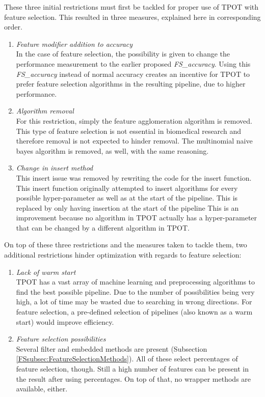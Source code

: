 \documentclass[10pt,a4paper]{report}
\begin{document}
	These three initial restrictions must first be tackled for proper use of TPOT with feature selection. This resulted in three measures, explained here in corresponding order.
	
	\begin{enumerate}
		\item \textit{Feature modifier addition to accuracy} \\
		In the case of feature selection, the possibility is given to change the performance measurement to the earlier proposed \textit{FS\_accuracy}. Using this \textit{FS\_accuracy} instead of normal accuracy creates an incentive for TPOT to prefer feature selection algorithms in the resulting pipeline, due to higher performance.
		\item \textit{Algorithm removal} \\
		For this restriction, simply the feature agglomeration algorithm is removed. This type of feature selection is not essential in biomedical research and therefore removal is not expected to hinder removal. The multinomial naive bayes algorithm is removed, as well, with the same reasoning.
		\item \textit{Change in insert method} \\
		This insert issue was removed by rewriting the code for the insert function. This insert function originally attempted to insert algorithms for every possible hyper-parameter as well as at the start of the pipeline. This is replaced by only having insertion at the start of the pipeline This is an improvement because no algorithm in TPOT actually has a hyper-parameter that can be changed by a different algorithm in TPOT.
	\end{enumerate}
	
	On top of these three restrictions and the measures taken to tackle them, two additional restrictions hinder optimization with regards to feature selection:
	
	\begin{enumerate}
		\item \textit{Lack of warm start} \\
		TPOT has a vast array of machine learning and preprocessing algorithms to find the best possible pipeline. Due to the number of possibilities being very high, a lot of time may be wasted due to searching in wrong directions. For feature selection, a pre-defined selection of pipelines (also known as a warm start) would improve efficiency.
		\item \textit{Feature selection possibilities} \\
		Several filter and embedded methods are present (Subsection \ref{FSsubsec:FeatureSelectionMethods}). All of these select percentages of feature selection, though. Still a high number of features can be present in the result after using percentages. On top of that, no wrapper methods are available, either.
	\end{enumerate}
	
\end{document}
